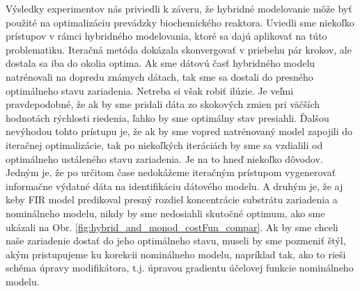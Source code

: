 Výsledky experimentov nás priviedli k záveru, že hybridné modelovanie môže byť použité na optimalizáciu prevádzky biochemického reaktora. Uviedli sme niekoľko prístupov v rámci hybridného modelovania, ktoré sa dajú aplikovať na túto problematiku. Iteračná metóda dokázala skonvergovať v priebehu pár krokov, ale dostala sa iba do okolia optima. Ak sme dátovú časť hybridného modelu natrénovali na dopredu známych dátach, tak sme sa dostali do presného optimálneho stavu zariadenia. Netreba si však robiť ilúzie. Je veľmi pravdepodobné, že ak by sme pridali dáta zo skokových zmien pri väčších hodnotách rýchlosti riedenia, ľahko by sme optimálny stav presiahli. Ďalšou nevýhodou tohto prístupu je, že ak by sme vopred natrénovaný model zapojili do iteračnej optimalizácie, tak po niekoľkých iteráciách by sme sa vzdialili od optimálneho ustáleného stavu zariadenia. Je na to hneď niekoľko dôvodov. Jedným je, že po určitom čase nedokážeme iteračným prístupom vygenerovať informačne výdatné dáta na identifikáciu dátového modelu. A druhým je, že aj keby FIR model predikoval presný rozdiel koncentrácie substrátu zariadenia a nominálneho modelu, nikdy by sme nedosiahli skutočné optimum, ako sme ukázali na Obr. \ref{fig:hybrid_and_monod_costFun_compar}. Ak by sme chceli naše zariadenie dostať do jeho optimálneho stavu, museli by sme pozmeniť štýl, akým pristupujeme ku korekcii nominálneho modelu, napríklad tak, ako to rieši schéma úpravy modifikátora, t.j. úpravou gradientu účelovej funkcie nominálneho modelu. 
